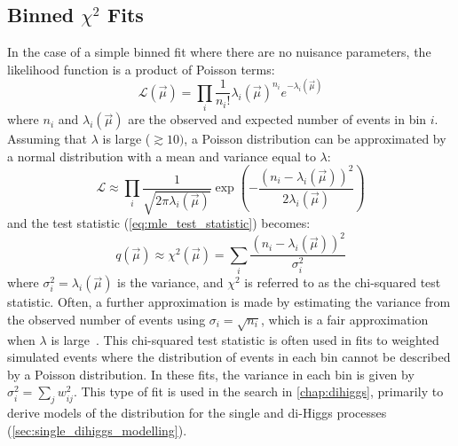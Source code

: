 \subsection[\texorpdfstring{Binned $\chi^2$ fits}{Binned chi2 Fits}]{Binned $\chi^2$ Fits}\label{sec:stats_chi2}
In the case of a simple binned fit where there are no nuisance parameters, the likelihood function is a product of Poisson terms:
\begin{equation}
  \mathcal{L}(\vec{\mu}) = \prod_i \frac{1}{n_i!} \lambda_i(\vec{\mu})^{n_i} e^{-\lambda_i(\vec{\mu})}
\end{equation}
where $n_i$ and $\lambda_i(\vec{\mu})$ are the observed and expected number of events in bin $i$. Assuming that $\lambda$ is large ($\gtrsim10)$, a Poisson distribution can be approximated by a normal distribution with a mean and variance equal to $\lambda$:
\begin{equation}
  \mathcal{L} \approx \prod_i \frac{1}{\sqrt{2\pi\lambda_i(\vec{\mu})}} \exp\left(-\frac{(n_i - \lambda_i(\vec{\mu}))^2}{2\lambda_i(\vec{\mu})}\right)
\end{equation}
and the test statistic (\cref{eq:mle_test_statistic}) becomes:
\begin{equation}
  q(\vec{\mu}) \approx \chi^2(\vec{\mu}) = \sum_i \frac{(n_i - \lambda_i(\vec{\mu}))^2}{\sigma_i^2} 
\end{equation}
where $\sigma_i^2=\lambda_i(\vec{\mu})$ is the variance, and $\chi^2$ is referred to as the chi-squared test statistic. Often, a further approximation is made by estimating the variance from the observed number of events using $\sigma_i = \sqrt{n_i}$, which is a fair approximation when $\lambda$ is large~\cite{ParticleDataGroup:2020ssz}. This chi-squared test statistic is often used in fits to weighted simulated events where the distribution of events in each bin cannot be described by a Poisson distribution. In these fits, the variance in each bin is given by $\sigma_i^2 = \sum_j w_{ij}^2$. This type of fit is used in the \ggtt search in \cref{chap:dihiggs}, primarily to derive models of the \mgg distribution for the single and di-Higgs processes (\cref{sec:single_dihiggs_modelling}).
